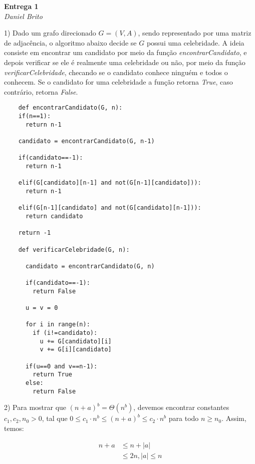 \documentclass[]{article}
\begin{document}
\begin{center}
  \Large\textbf{Entrega 1}\\
  \large\textit{Daniel Brito}
\end{center}

\vspace{0.5cm}

1) Dado um grafo direcionado $G=(V, A)$, sendo representado por uma matriz de adjacência, o algoritmo abaixo decide se $G$ possui uma celebridade. A ideia consiste em encontrar um candidato por meio da função \textit{encontrarCandidato}, e depois verificar se ele é realmente uma celebridade ou não, por meio da função \textit{verificarCelebridade}, checando se o candidato conhece ninguém e todos o conhecem. Se o candidato for uma celebridade a função retorna \textit{True}, caso contrário, retorna \textit{False}.

\begin{lstlisting}
    def encontrarCandidato(G, n):
	if(n==1): 
	  return n-1

	candidato = encontrarCandidato(G, n-1) 
	
	if(candidato==-1): 
	  return n-1
    
	elif(G[candidato][n-1] and not(G[n-1][candidato])): 
	  return n-1
    
	elif(G[n-1][candidato] and not(G[candidato][n-1])): 
	  return candidato 

	return -1

    def verificarCelebridade(G, n): 
        
      candidato = encontrarCandidato(G, n)
        
      if(candidato==-1):
        return False
    	
      u = v = 0
    
      for i in range(n): 
        if (i!=candidato): 
          u += G[candidato][i] 
          v += G[i][candidato]
    
      if(u==0 and v==n-1): 
        return True
      else:
        return False
\end{lstlisting}

\newpage

2) Para mostrar que $(n+a)^b = \Theta(n^b)$, devemos encontrar constantes $c_1, c_2, n_0 > 0$, tal que $0 \leq c_1 \cdot n^b \leq (n+a)^b \leq c_2 \cdot n^b$ para todo $n \geq n_0$. Assim, temos:

\begin{align*}
    n+a & \leq n+|a| \\
        & \leq 2n, |a| \leq n
\end{align*}
\end{document}
